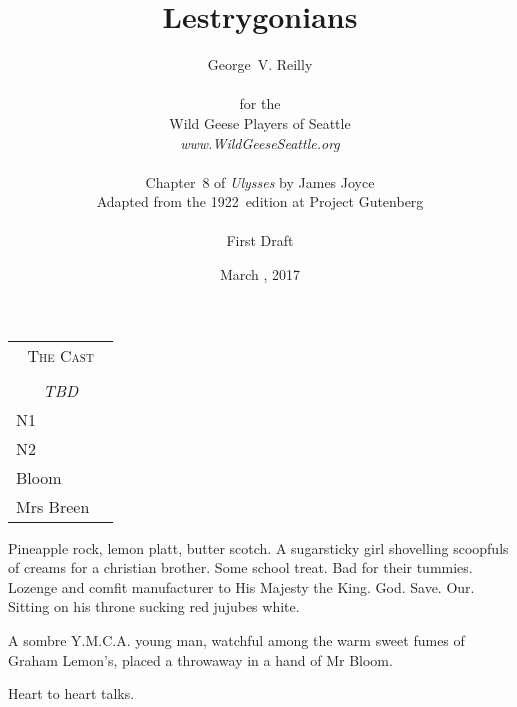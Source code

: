 


\title{\Huge Lestrygonians}
\author{George~V. Reilly\\
\\
{\small for the}\\
Wild Geese Players of Seattle\\
{\emph{www.WildGeeseSeattle.org}}\\
\\
{\small Chapter~8 of \emph{Ulysses} by James Joyce}\\
{\small Adapted from the 1922~edition at Project Gutenberg}
\\
\\
{\small First Draft}}
\date{March , 2017}
\raggedbottom



\maketitle
\thispagestyle{empty}
\pagebreak

\begin{tabular}{lp{10cm}}
    \multicolumn{2}{c}{\Large \textsc{The Cast}} \\
\\
    \multicolumn{2}{c}{\large \textit{TBD}} \\
N1 \\
N2 \\
Bloom \\
Mrs Breen \\
\end{tabular}

\thispagestyle{empty}
\newpage


\setcounter{page}{1}

Pineapple rock, lemon platt, butter scotch.
A sugarsticky girl shovelling scoopfuls of creams for a christian brother.
Some school treat.
Bad for their tummies.
Lozenge and comfit manufacturer to His Majesty the King.
God.
Save.
Our.
Sitting on his throne sucking red jujubes white.

A sombre Y.M.C.A. young man,
watchful among the warm sweet fumes of Graham Lemon's,
placed a throwaway in a hand of Mr Bloom.

Heart to heart talks.

